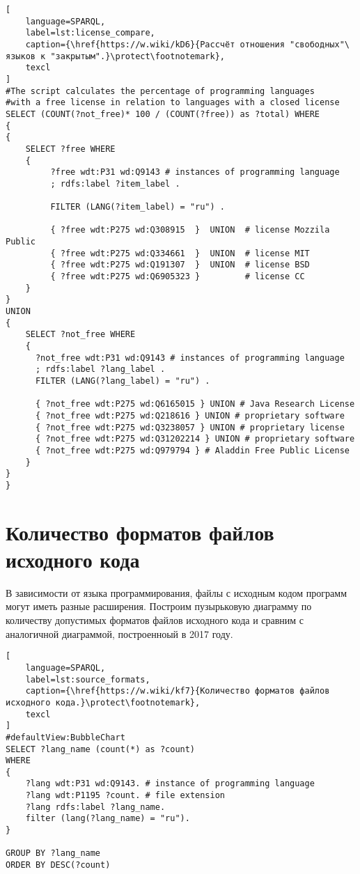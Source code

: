 \begin{lstlisting}[
	language=SPARQL,
	label=lst:license_compare,
	caption={\href{https://w.wiki/kD6}{Рассчёт отношения "свободных"\ языков к "закрытым".}\protect\footnotemark},
	texcl
]
#The script calculates the percentage of programming languages 
#with a free license in relation to languages with a closed license
SELECT (COUNT(?not_free)* 100 / (COUNT(?free)) as ?total) WHERE
{ 
{
    SELECT ?free WHERE 
    {
         ?free wdt:P31 wd:Q9143 # instances of programming language
         ; rdfs:label ?item_label . 

         FILTER (LANG(?item_label) = "ru") . 
  
         { ?free wdt:P275 wd:Q308915  }  UNION  # license Mozzila Public
         { ?free wdt:P275 wd:Q334661  }  UNION  # license MIT
         { ?free wdt:P275 wd:Q191307  }  UNION  # license BSD
         { ?free wdt:P275 wd:Q6905323 }         # license CC
    }
}
UNION
{
    SELECT ?not_free WHERE 
    {
      ?not_free wdt:P31 wd:Q9143 # instances of programming language
      ; rdfs:label ?lang_label . 
      FILTER (LANG(?lang_label) = "ru") .
  
      { ?not_free wdt:P275 wd:Q6165015 } UNION # Java Research License
      { ?not_free wdt:P275 wd:Q218616 } UNION # proprietary software
      { ?not_free wdt:P275 wd:Q3238057 } UNION # proprietary license 
      { ?not_free wdt:P275 wd:Q31202214 } UNION # proprietary software 
      { ?not_free wdt:P275 wd:Q979794 } # Aladdin Free Public License
    }
}
}
\end{lstlisting}

\section{Количество форматов файлов исходного кода}
В зависимости от языка программирования, файлы с исходным кодом программ могут иметь разные расширения. Построим пузырьковую диаграмму по количеству допустимых форматов файлов исходного кода и сравним с аналогичной диаграммой, построенноый в 2017 году.

\pagebreak

\begin{lstlisting}[
	language=SPARQL,
	label=lst:source_formats,
	caption={\href{https://w.wiki/kf7}{Количество форматов файлов исходного кода.}\protect\footnotemark},
	texcl
]
#defaultView:BubbleChart
SELECT ?lang_name (count(*) as ?count)
WHERE
{
    ?lang wdt:P31 wd:Q9143. # instance of programming language
  	?lang wdt:P1195 ?count. # file extension
  	?lang rdfs:label ?lang_name.
    filter (lang(?lang_name) = "ru").
}

GROUP BY ?lang_name 
ORDER BY DESC(?count)
\end{lstlisting}

